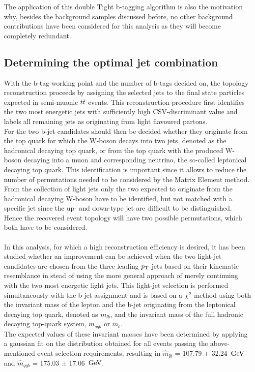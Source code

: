The application of this double Tight b-tagging algorithm is also the motivation why, besides the background samples discussed before, no other background contributions have been considered for this analysis as they will become completely redundant.

\subsection{Determining the optimal jet combination}
With the b-tag working point and the number of b-tags decided on, the topology reconstruction proceeds by assigning the selected jets to the final state particles expected in semi-muonic $t\bar{t}$ events.
This reconstruction procedure first identifies the two most energetic jets with sufficiently high CSV-discriminant value and labels all remaining jets as originating from light flavoured partons.
\\
For the two b-jet candidates should then be decided whether they originate from the top quark for which the W-boson decays into two jets, denoted as the hadronical decaying top quark, or from the top quark with the produced W-boson decaying into a muon and corresponding neutrino, the so-called leptonical decaying top quark.
This identification is important since it allows to reduce the number of permutations needed to be considered by the Matrix Element method.
From the collection of light jets only the two expected to originate from the hadronical decaying W-boson have to be identified, but not matched with a specific jet since the up- and down-type jet are difficult to be distinguished. Hence the recovered event topology will have two possible permutations, which both have to be considered.
\\
\\
In this analysis, for which a high reconstruction efficiency is desired, it has been studied whether an improvement can be achieved when the two light-jet candidates are chosen from the three leading $p_{\rm T}$ jets based on their kinematic resemblance in stead of using the more general approach of merely continuing with the two most energetic light jets.
This light-jet selection is performed simultaneously with the b-jet assignment and is based on a $\chi^{2}$-method using both the invariant mass of the lepton and the b-jet originating from the leptonical decaying top quark, denoted as $m_{lb}$, and the invariant mass of the full hadronic decaying top-quark system, $m_{qqb}$ or $m_{t}$.
\\
The expected values of these invariant masses have been determined by applying a gaussian fit on the distribution obtained for all events passing the above-mentioned event selection requirements, resulting in $\hat{m}_{lb}$ =  107.79 $\pm$ 32.24 $\, \mathrm{GeV}$ and $\hat{m}_{qqb}$ = 175.03 $\pm$ 17.06 $\, \mathrm{GeV}$.
